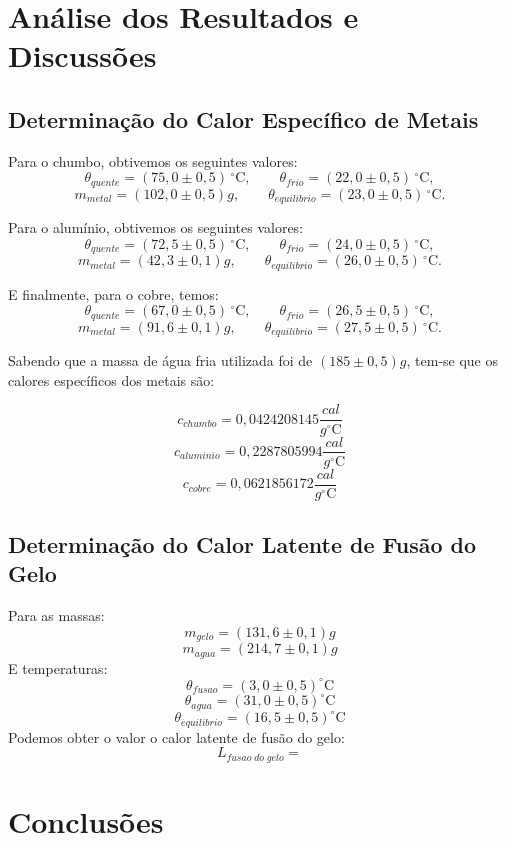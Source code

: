 \documentclass[12pt,a4paper]{article}
\begin{document}
\section{Análise dos Resultados e Discussões}


\subsection{Determinação do Calor Específico de Metais}

Para o chumbo, obtivemos os seguintes valores:
$$ \theta_{quente} = (75,0 \pm 0,5)\,^{\circ}\mathrm{C}, \qquad \theta_{frio} = (22,0 \pm 0,5)\,^{\circ}\mathrm{C}, $$
$$ m_{metal} = (102,0 \pm 0,5)g, \qquad \theta_{equilibrio} = (23,0 \pm 0,5)\,^{\circ}\mathrm{C}. $$


Para o alumínio, obtivemos os seguintes valores:
$$ \theta_{quente} = (72,5 \pm 0,5)\,^{\circ}\mathrm{C}, \qquad \theta_{frio} = (24,0 \pm 0,5)\,^{\circ}\mathrm{C}, $$
$$ m_{metal} = (42,3 \pm 0,1)g, \qquad \theta_{equilibrio} = (26,0 \pm 0,5)\,^{\circ}\mathrm{C}. $$


 E finalmente, para o cobre, temos:
$$ \theta_{quente} = (67,0 \pm 0,5)\,^{\circ}\mathrm{C}, \qquad \theta_{frio} = (26,5 \pm 0,5)\,^{\circ}\mathrm{C}, $$
$$ m_{metal} = (91,6 \pm 0,1)g, \qquad \theta_{equilibrio} = (27,5 \pm 0,5)\,^{\circ}\mathrm{C}. $$

Sabendo que a massa de água fria utilizada foi de $(185 \pm 0,5)g$, tem-se que os calores específicos dos metais são:


$$ c_{chumbo} = 0,0424208145 \dfrac{cal}{g^{\circ}\mathrm{C}}$$
$$ c_{aluminio} = 0,2287805994 \dfrac{cal}{g^{\circ}\mathrm{C}}$$
$$ c_{cobre} = 0,0621856172 \dfrac{cal}{g^{\circ}\mathrm{C}}$$

\subsection{Determinação do Calor Latente de Fusão do Gelo}

Para as massas:
$$ m_{gelo} = (131,6 \pm 0,1) g $$
$$ m_{agua} = (214,7 \pm 0,1)g $$
E temperaturas:
$$ \theta_{fusao} = (3,0 \pm 0,5)^{\circ}\mathrm{C} $$
$$ \theta_{agua} = (31,0 \pm 0,5)^{\circ}\mathrm{C} $$
$$ \theta_{equilibrio} = (16,5 \pm 0,5)^{\circ}\mathrm{C} $$
Podemos obter o valor o calor latente de fusão do gelo:
$$ L_{fusao\;do\;gelo} = $$

\section{Conclusões}
\end{document}
